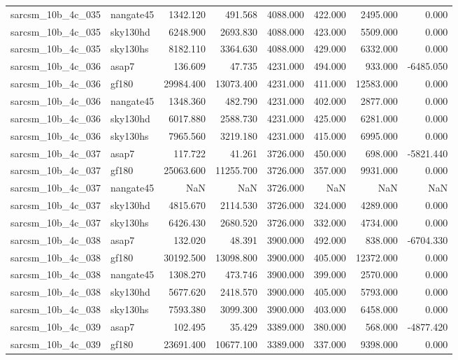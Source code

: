 \begin{tabular}{llrrrrrr}
sarcsm\_10b\_4c\_035 & nangate45 & 1342.120 & 491.568 & 4088.000 & 422.000 & 2495.000 & 0.000 \\
sarcsm\_10b\_4c\_035 & sky130hd & 6248.900 & 2693.830 & 4088.000 & 423.000 & 5509.000 & 0.000 \\
sarcsm\_10b\_4c\_035 & sky130hs & 8182.110 & 3364.630 & 4088.000 & 429.000 & 6332.000 & 0.000 \\
sarcsm\_10b\_4c\_036 & asap7 & 136.609 & 47.735 & 4231.000 & 494.000 & 933.000 & -6485.050 \\
sarcsm\_10b\_4c\_036 & gf180 & 29984.400 & 13073.400 & 4231.000 & 411.000 & 12583.000 & 0.000 \\
sarcsm\_10b\_4c\_036 & nangate45 & 1348.360 & 482.790 & 4231.000 & 402.000 & 2877.000 & 0.000 \\
sarcsm\_10b\_4c\_036 & sky130hd & 6017.880 & 2588.730 & 4231.000 & 425.000 & 6281.000 & 0.000 \\
sarcsm\_10b\_4c\_036 & sky130hs & 7965.560 & 3219.180 & 4231.000 & 415.000 & 6995.000 & 0.000 \\
sarcsm\_10b\_4c\_037 & asap7 & 117.722 & 41.261 & 3726.000 & 450.000 & 698.000 & -5821.440 \\
sarcsm\_10b\_4c\_037 & gf180 & 25063.600 & 11255.700 & 3726.000 & 357.000 & 9931.000 & 0.000 \\
sarcsm\_10b\_4c\_037 & nangate45 & NaN & NaN & 3726.000 & NaN & NaN & NaN \\
sarcsm\_10b\_4c\_037 & sky130hd & 4815.670 & 2114.530 & 3726.000 & 324.000 & 4289.000 & 0.000 \\
sarcsm\_10b\_4c\_037 & sky130hs & 6426.430 & 2680.520 & 3726.000 & 332.000 & 4734.000 & 0.000 \\
sarcsm\_10b\_4c\_038 & asap7 & 132.020 & 48.391 & 3900.000 & 492.000 & 838.000 & -6704.330 \\
sarcsm\_10b\_4c\_038 & gf180 & 30192.500 & 13098.800 & 3900.000 & 405.000 & 12372.000 & 0.000 \\
sarcsm\_10b\_4c\_038 & nangate45 & 1308.270 & 473.746 & 3900.000 & 399.000 & 2570.000 & 0.000 \\
sarcsm\_10b\_4c\_038 & sky130hd & 5677.620 & 2418.570 & 3900.000 & 405.000 & 5793.000 & 0.000 \\
sarcsm\_10b\_4c\_038 & sky130hs & 7593.380 & 3099.300 & 3900.000 & 403.000 & 6458.000 & 0.000 \\
sarcsm\_10b\_4c\_039 & asap7 & 102.495 & 35.429 & 3389.000 & 380.000 & 568.000 & -4877.420 \\
sarcsm\_10b\_4c\_039 & gf180 & 23691.400 & 10677.100 & 3389.000 & 337.000 & 9398.000 & 0.000 \\

\end{tabular}
